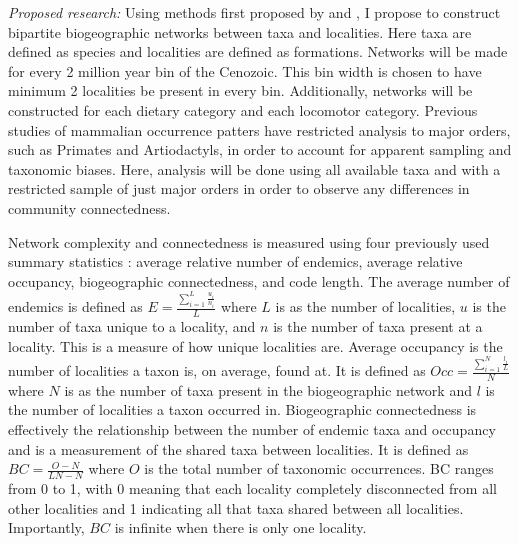 \documentclass[12pt,letterpaper]{article}
\begin{document}
\textit{Proposed research:}
Using methods first proposed by \citet{Sidor2013} and \citet{Vilhena2013}, I propose to construct bipartite biogeographic networks between taxa and localities. Here taxa are defined as species and localities are defined as formations. Networks will be made for every 2 million year bin of the Cenozoic. This bin width is chosen to have minimum 2 localities be present in every bin. Additionally, networks will be constructed for each dietary category and each locomotor category. Previous studies of mammalian occurrence patters have restricted analysis to major orders, such as Primates and Artiodactyls, in order to account for apparent sampling and taxonomic biases. Here, analysis will be done using all available taxa and with a restricted sample of just major orders in order to observe any differences in community connectedness.

Network complexity and connectedness is measured using four previously used summary statistics \citep{Sidor2013}: average relative number of endemics, average relative occupancy, biogeographic connectedness, and code length. The average number of endemics is defined as 
\(
  E = \frac{\sum_{i = 1}^{L} \frac{u_{i}}{n_{i}}}{L}
\)
where \(L\) is as the number of localities, \(u\) is the number of taxa unique to a locality, and \(n\) is the number of taxa present at a locality. This is a measure of how unique localities are. Average occupancy is the number of localities a taxon is, on average, found at. It is defined as 
\(
  Occ = \frac{\sum_{i = 1}^{N} \frac{l_{i}}{L}}{N}
\)
where \(N\) is as the number of taxa present in the biogeographic network and \(l\) is the number of localities a taxon occurred in. Biogeographic connectedness is effectively the relationship between the number of endemic taxa and occupancy and is a measurement of the shared taxa between localities. It is defined as 
\(
  BC = \frac{O - N}{LN - N}
\)
where \(O\) is the total number of taxonomic occurrences. BC ranges from 0 to 1, with 0 meaning that each locality completely disconnected from all other localities and 1 indicating all that taxa shared between all localities. Importantly, \(BC\) is infinite when there is only one locality.
\end{document}
